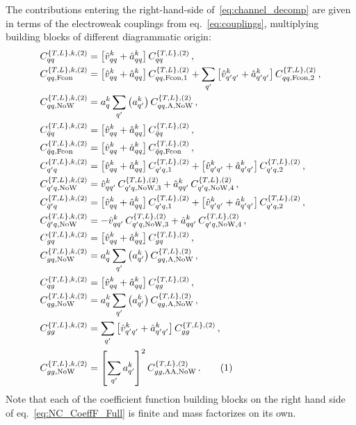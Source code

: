 \documentclass[11pt,a4paper]{article}
\newcommand{\qb}{\bar{q}}
\newcommand{\qp}{{q^\prime}}
\newcommand{\qbp}{{\bar{q}^\prime}}
\newcommand{\vh}{\hat{v}}
\newcommand{\ah}{\hat{a}}
\newcommand\numberthis{\addtocounter{equation}{1}\tag{\theequation}}
\newcommand{\NoW}{\mathrm{NoW}}
\newcommand{\Fcon}{\mathrm{Fcon}}
\newcommand{\aSa}{\mathrm{A}}
\newcommand{\SaSa}{\mathrm{AA}}
\begin{document}
The contributions entering the right-hand-side of~\eqref{eq:channel_decomp} are given in terms of the electroweak couplings from eq.~\eqref{eq:couplings},
multiplying building blocks of different diagrammatic origin:
\begin{align*}
C^{\{T,L\},k,(2)}_{qq} & = \left[ \vh_{qq}^k + \ah_{qq}^k \right]C^{\{T,L\},(2)}_{qq}  \,  , \\
%
C^{\{T,L\},k,(2)}_{qq, \Fcon} &= \left[ \vh_{qq}^k + \ah_{qq}^k \right] C^{\{T,L\},(2)}_{qq,\Fcon,1} + \sum_{\qp} \left[ \vh_{\qp\qp}^k + \ah_{\qp\qp}^k \right] C^{\{T,L\},(2)}_{qq,{\Fcon},2}  \,  , \\
%
C^{\{T,L\},k,(2)}_{qq,\NoW} &= a^k_q \sum_{\qp} \left( a^k_{\qp} \right) C^{\{T,L\},(2)}_{qq, \aSa,\NoW}  \,  , \\
%
C^{\{T,L\},k,(2)}_{\qb q} & = \left[ \vh_{qq}^k + \ah_{qq}^k \right]C^{\{T,L\},(2)}_{\qb q}  \,  , \\
%
C^{\{T,L\},k,(2)}_{\qb q, \Fcon} &= \left[ \vh_{qq}^k + \ah_{qq}^k \right] C^{\{T,L\},(2)}_{\qb q, \Fcon}  \,  , \\
%
C^{\{T,L\},k,(2)}_{\qp q} & =  \left[ \vh_{qq}^k + \ah_{qq}^k \right]C^{\{T,L\},(2)}_{\qp q, 1} + \left[ \vh_{\qp\qp}^k + \ah_{\qp\qp}^k \right]C^{\{T,L\},(2)}_{\qp q, 2} \,  , \\
%
C^{\{T,L\},k,(2)}_{\qp q, \NoW} &= \vh_{q\qp}^k \,  C^{\{T,L\},(2)}_{\qp q, \NoW, 3} + \ah_{q\qp}^k \, C^{\{T,L\},(2)}_{\qp q, \NoW, 4}  \,  , \\
%
C^{\{T,L\},k,(2)}_{\qbp q} & = \left[ \vh_{qq}^k + \ah_{qq}^k \right]C^{\{T,L\},(2)}_{\qp q, 1} + \left[ \vh_{\qp\qp}^k + \ah_{\qp\qp}^k \right]C^{\{T,L\},(2)}_{\qp q, 2} \,  , \\
%
C^{\{T,L\},k,(2)}_{\qbp q, \NoW} &= - \vh_{q\qp}^k \, C^{\{T,L\},(2)}_{\qp q, \NoW, 3}+ \ah_{q\qp}^k \, C^{\{T,L\},(2)}_{\qp q, \NoW, 4}  \,  , \\
%
C^{\{T,L\},k,(2)}_{gq} &= \left[ \vh_{qq}^k + \ah_{qq}^k \right] C^{\{T,L\},(2)}_{gq} \, ,  \\
%
C^{\{T,L\},k,(2)}_{gq,\NoW} &= a^k_q \sum_{q'} \left( a^k_{q'} \right) C^{\{T,L\},(2)}_{gq, \aSa,\NoW}  \,  , \\
%
C^{\{T,L\},k,(2)}_{qg} &= \left[ \vh_{qq}^k + \ah_{qq}^k \right] C^{\{T,L\},(2)}_{qg} \, ,  \\
%
C^{\{T,L\},k,(2)}_{qg,\NoW} &= a^k_q \sum_{q'} \left( a^k_{q'} \right) C^{\{T,L\},(2)}_{q g, \aSa,\NoW}  \,  , \\
%
C^{\{T,L\},k,(2)}_{gg} &=\sum_{q'} \left[ \vh_{\qp\qp}^k + \ah_{\qp\qp}^k \right] C^{\{T,L\},(2)}_{gg} \, ,  \\
%
C^{\{T,L\},k,(2)}_{gg,\NoW} &= \left[ \sum_{q'} a^k_{\qp} \right]^2  C^{\{T,L\},(2)}_{g g, \SaSa,\NoW}  \,  . \numberthis
\label{eq:NC_CoeffF_Full}
\end{align*}
Note that each of the coefficient function building blocks on the right hand side of eq.~\eqref{eq:NC_CoeffF_Full} is finite and mass factorizes on its own.
\end{document}
